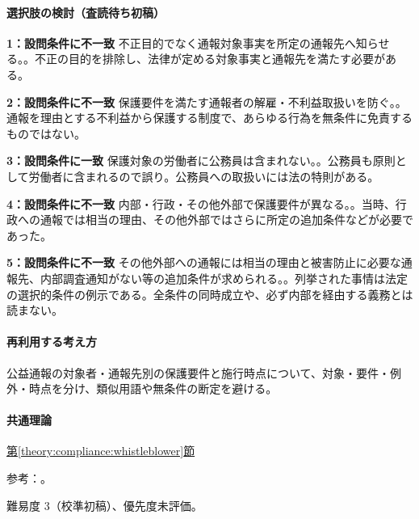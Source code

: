 \paragraph{選択肢の検討（査読待ち初稿）}\mbox{}\par

\noindent\textbf{1：設問条件に不一致} 不正目的でなく通報対象事実を所定の通報先へ知らせる。。不正の目的を排除し、法律が定める対象事実と通報先を満たす必要がある。\par

\noindent\textbf{2：設問条件に不一致} 保護要件を満たす通報者の解雇・不利益取扱いを防ぐ。。通報を理由とする不利益から保護する制度で、あらゆる行為を無条件に免責するものではない。\par

\noindent\textbf{3：設問条件に一致} 保護対象の労働者に公務員は含まれない。。公務員も原則として労働者に含まれるので誤り。公務員への取扱いには法の特則がある。\par

\noindent\textbf{4：設問条件に不一致} 内部・行政・その他外部で保護要件が異なる。。当時、行政への通報では相当の理由、その他外部ではさらに所定の追加条件などが必要であった。\par

\noindent\textbf{5：設問条件に不一致} その他外部への通報には相当の理由と被害防止に必要な通報先、内部調査通知がない等の追加条件が求められる。。列挙された事情は法定の選択的条件の例示である。全条件の同時成立や、必ず内部を経由する義務とは読まない。\par

\paragraph{再利用する考え方} 公益通報の対象者・通報先別の保護要件と施行時点について、対象・要件・例外・時点を分け、類似用語や無条件の断定を避ける。

\paragraph{共通理論} \hyperref[theory:compliance:whistleblower]{第\ref*{theory:compliance:whistleblower}節}

\par 参考：\cite{caa_handbook_pre2022,caa_report_current,caa_amend2020,caa_schedule2026}。

\par 難易度 3（校準初稿）、優先度未評価。

